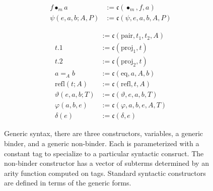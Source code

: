 \begin{figure}
\begin{minipage}{0.5\textwidth}
\begin{align*}
            f \bullet_m a &:= \mathfrak{c}(\bullet_m, f, a) \\
            \psi(e, a, b; A, P) &:= \mathfrak{c}(\psi, e, a, b, A, P)
        \end{align*}
    \end{minipage}%
    \begin{minipage}{0.5\textwidth}
        \begin{align*}
            [t_1, t_2; A] &:= \mathfrak{c}(\text{pair}, t_1, t_2, A) \\
            t.1 &:= \mathfrak{c}(\text{proj}_1, t) \\
            t.2 &:= \mathfrak{c}(\text{proj}_2, t) \\
            a =_{A} b &:= \mathfrak{c}(\text{eq}, a, A, b) \\
            \text{refl}(t; A) &:= \mathfrak{c}(\text{refl}, t, A) \\
            \vartheta(e, a, b; T) &:= \mathfrak{c}(\vartheta, e, a, b, T) \\
            \varphi(a, b, e) &:= \mathfrak{c}(\varphi, a, b, e, A, T) \\
            \delta(e) &:= \mathfrak{c}(\delta, e)
        \end{align*}
    \end{minipage}
    \caption{Generic syntax, there are three constructors, variables, a generic binder, and a generic non-binder. Each is parameterized with a constant tag to specialize to a particular syntactic consruct. The non-binder constructor has a vector of subterms determined by an arity function computed on tags. Standard syntactic constructors are defined in terms of the generic forms.}
    \label{fig:syntax}
\end{figure}
